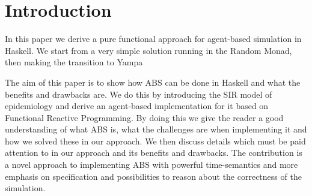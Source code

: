 \section{Introduction}
In this paper we derive a pure functional approach for agent-based simulation in Haskell. We start from a very simple solution running in the Random Monad, then making the transition to Yampa 

The aim of this paper is to show how ABS can be done in Haskell and what the benefits and drawbacks are. We do this by introducing the SIR model of epidemiology and derive an agent-based implementation for it based on Functional Reactive Programming. By doing this we give the reader a good understanding of what ABS is, what the challenges are when implementing it and how we solved these in our approach. We then discuss details which must be paid attention to in our approach and its benefits and drawbacks. The contribution is a novel approach to implementing ABS with powerful time-semantics and more emphasis on specification and possibilities to reason about the correctness of the simulation.